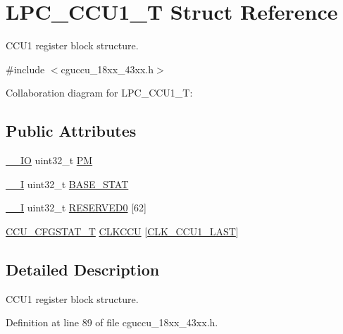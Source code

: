 \hypertarget{struct_l_p_c___c_c_u1___t}{}\section{L\+P\+C\+\_\+\+C\+C\+U1\+\_\+T Struct Reference}
\label{struct_l_p_c___c_c_u1___t}


C\+C\+U1 register block structure.  




{\ttfamily \#include $<$cguccu\+\_\+18xx\+\_\+43xx.\+h$>$}



Collaboration diagram for L\+P\+C\+\_\+\+C\+C\+U1\+\_\+T\+:
\subsection*{Public Attributes}
\begin{DoxyCompactItemize}
\item 
\hyperlink{core__sc300_8h_aec43007d9998a0a0e01faede4133d6be}{\+\_\+\+\_\+\+IO} uint32\+\_\+t \hyperlink{struct_l_p_c___c_c_u1___t_a82e63af1688482d47ba305b4f41794da}{PM}
\item 
\hyperlink{core__sc300_8h_af63697ed9952cc71e1225efe205f6cd3}{\+\_\+\+\_\+I} uint32\+\_\+t \hyperlink{struct_l_p_c___c_c_u1___t_a74e7757a44f17dfe259267a9aab78682}{B\+A\+S\+E\+\_\+\+S\+T\+AT}
\item 
\hyperlink{core__sc300_8h_af63697ed9952cc71e1225efe205f6cd3}{\+\_\+\+\_\+I} uint32\+\_\+t \hyperlink{struct_l_p_c___c_c_u1___t_abd261ac583b5b596db43e2b8854c2967}{R\+E\+S\+E\+R\+V\+E\+D0} \mbox{[}62\mbox{]}
\item 
\hyperlink{struct_c_c_u___c_f_g_s_t_a_t___t}{C\+C\+U\+\_\+\+C\+F\+G\+S\+T\+A\+T\+\_\+T} \hyperlink{struct_l_p_c___c_c_u1___t_aef36abb1875605ca9e9dd52995c040ff}{C\+L\+K\+C\+CU} \mbox{[}\hyperlink{chip__clocks_8h_a500a6084ba2d6361fa16b75205a8a513af43f3366ad619d1ac63ac44a6efc0343}{C\+L\+K\+\_\+\+C\+C\+U1\+\_\+\+L\+A\+ST}\mbox{]}
\end{DoxyCompactItemize}


\subsection{Detailed Description}
C\+C\+U1 register block structure. 

Definition at line 89 of file cguccu\+\_\+18xx\+\_\+43xx.\+h.



